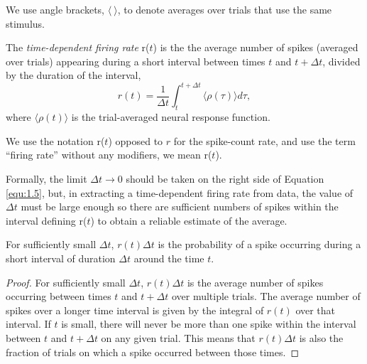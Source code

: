 \begin{ntn}
  We use angle brackets, $\langle\ \rangle $, to denote averages over trials that use the same stimulus.
\end{ntn}


\begin{defn}
  The \emph{time-dependent firing rate} r($t$) is the the average number of spikes (averaged over trials) appearing 
  during a
  short interval between times $t$ and $t+\Delta t$, divided by the duration of
   the interval,
   \begin{equation}
    \label{equ:1.5}
     r(t)=\frac{1}{\Delta t}\int_t^{t+\Delta t}\langle \rho(\tau)\rangle d\tau,
   \end{equation}
   where $\langle\rho(t)\rangle$ is the trial-averaged neural response function.
\end{defn}      

\begin{ntn}
  We use the notation r($t$) opposed to $r$ for the spike-count rate, and use the term 
  “firing rate” without any
modifiers, we mean r($t$).
\end{ntn}

\begin{rem}
  Formally, the limit $\Delta t\rightarrow 0$ should be taken on
the right side of Equation \ref{equ:1.5}, but, in extracting a time-dependent firing
rate from data, the value of $\Delta t$ must be large enough so there are sufficient
numbers of spikes within the interval defining r($t$) to obtain a reliable estimate of the 
average.
\end{rem}

\begin{prop}
  For sufficiently small $\Delta t$, $r(t)\Delta t$ 
  is the probability of a spike occurring during a short interval of duration $\Delta t$ around the time $t$.
  \begin{proof}
  For sufficiently small $\Delta t$, $r(t)\Delta t$ is the average number of spikes occurring
between times $t$ and $t + \Delta t$ over multiple trials. The average number of
spikes over a longer time interval is given by the integral of $r ( t )$ over that
interval. If $t$ is small, there will never be more than one spike within the
interval between $t$ and $t + \Delta t$ on any given trial. This means that $r(t)\Delta t$ is
also the fraction of trials on which a spike occurred between those times.
\end{proof}
\end{prop}



